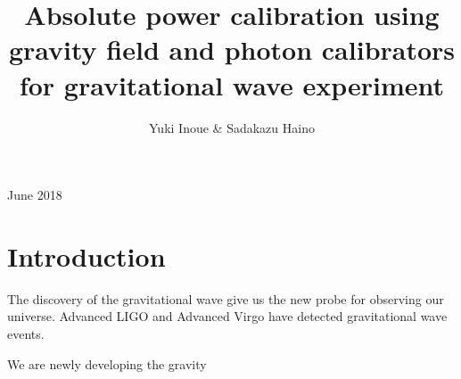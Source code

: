 \documentclass[12pt]{iopart}
\begin{document}
\title[]{Absolute power calibration using gravity field and photon calibrators for gravitational wave experiment}

\author{Yuki Inoue \& Sadakazu Haino}

\address{IOP Publishing, Temple Circus, Temple Way, Bristol BS1 6HG, UK}
\vspace{10pt}
\begin{indented}
\item[]June 2018
\end{indented}

\begin{abstract}
\end{abstract}

%
%
%
% 
%



\section{Introduction}

The discovery of the gravitational wave give us the new probe for observing our universe. Advanced LIGO and Advanced Virgo have detected gravitational wave events.



We are newly developing the gravity
\end{document}
